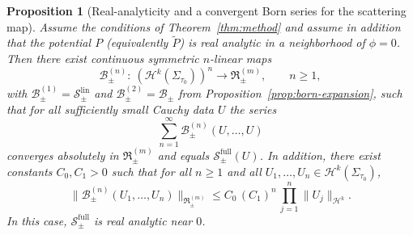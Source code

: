 \documentclass[11pt]{article}
\numberwithin{equation}{section}
\theoremstyle{plain}
\newtheorem{proposition}[theorem]{Proposition}
\theoremstyle{definition}
\theoremstyle{remark}
\begin{document}
\begin{proposition}[Real-analyticity and a convergent Born series for the scattering map]\label{prop:analytic-series}
Assume the conditions of Theorem~\ref{thm:method} and assume in addition that the potential $P$ (equivalently $\widetilde P$) is real analytic in a neighborhood of $\phi=0$.
Then there exist continuous symmetric $n$-linear maps
\begin{equation}
\mathscr B_{\pm}^{(n)}:\ (\mathcal H^{k}(\Sigma_{\tau_{0}}))^{n}\longrightarrow \mathfrak R_{\pm}^{(m)},\qquad n\ge1,
\end{equation}
with $\mathscr B_{\pm}^{(1)}=\mathscr S_{\pm}^{\mathrm{lin}}$ and $\mathscr B_{\pm}^{(2)}=\mathscr B_{\pm}$ from Proposition~\ref{prop:born-expansion}, such that for all sufficiently small Cauchy data $U$ the series
\begin{equation}\label{eq:born-series}
\sum_{n=1}^{\infty}\mathscr B_{\pm}^{(n)}(U,\dots,U)
\end{equation}
converges absolutely in $\mathfrak R_{\pm}^{(m)}$ and equals $\mathscr S_{\pm}^{\mathrm{full}}(U)$.
In addition, there exist constants $C_{0},C_{1}>0$ such that for all $n\ge1$ and all $U_{1},\dots,U_{n}\in \mathcal H^{k}(\Sigma_{\tau_{0}})$,
\begin{equation}\label{eq:born-multilinear-bound}
\bigl\|\mathscr B_{\pm}^{(n)}(U_{1},\dots,U_{n})\bigr\|_{\mathfrak R_{\pm}^{(m)}}
\le
C_{0}\,(C_{1})^{n}\,\prod_{j=1}^{n}\|U_{j}\|_{\mathcal H^{k}}.
\end{equation}
In this case, $\mathscr S_{\pm}^{\mathrm{full}}$ is real analytic near $0$.
\end{proposition}
\end{document}
